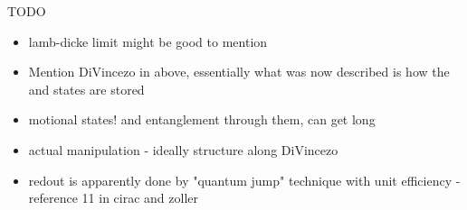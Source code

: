 TODO
\begin{itemize}
    \item lamb-dicke limit might be good to mention
    \item Mention DiVincezo in above, essentially what was now described is how the \kz and \ko states are stored
    \item motional states! and entanglement through them, can get long
    \item actual manipulation - ideally structure along DiVincezo
    \item redout is apparently done by "quantum jump" technique with unit efficiency - reference 11 in cirac and zoller
\end{itemize}

